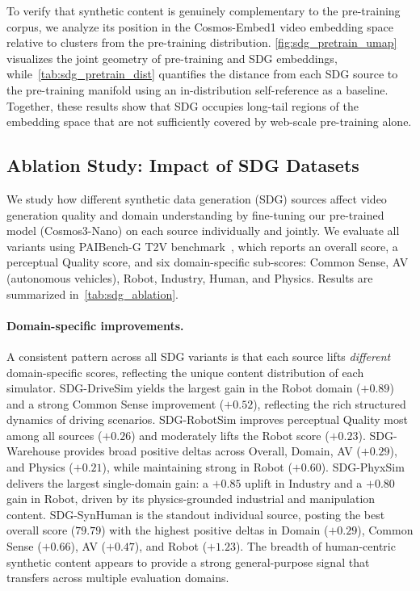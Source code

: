 

To verify that synthetic content is genuinely complementary to the pre-training corpus, we analyze its position in the Cosmos-Embed1 video embedding space relative to clusters from the pre-training distribution. \cref{fig:sdg_pretrain_umap} visualizes the joint geometry of pre-training and SDG embeddings, while~\cref{tab:sdg_pretrain_dist} quantifies the distance from each SDG source to the pre-training manifold using an in-distribution self-reference as a baseline. Together, these results show that SDG occupies long-tail regions of the embedding space that are not sufficiently covered by web-scale pre-training alone.

\subsection{Ablation Study: Impact of SDG Datasets}
\label{appendix:sdg_ablation}

We study how different synthetic data generation (SDG) sources affect video generation quality and domain understanding by fine-tuning our pre-trained model (Cosmos3-Nano) on each source individually and jointly. We evaluate all variants using PAIBench-G T2V benchmark~\citep{zhou2025paibench}, which reports an overall score, a perceptual Quality score, and six domain-specific sub-scores: Common Sense, AV (autonomous vehicles), Robot,
Industry, Human, and Physics. Results are summarized in~\cref{tab:sdg_ablation}.



\paragraph{Domain-specific improvements.}
A consistent pattern across all SDG variants is that each source lifts
\emph{different} domain-specific scores, reflecting the unique content
distribution of each simulator.
SDG-DriveSim yields the largest
gain in the Robot domain ($+0.89$) and a strong Common Sense improvement
($+0.52$), reflecting the rich structured dynamics of driving scenarios.
SDG-RobotSim improves perceptual Quality most among all sources ($+0.26$) and
moderately lifts the Robot score ($+0.23$). SDG-Warehouse provides broad
positive deltas across Overall, Domain, AV ($+0.29$), and Physics ($+0.21$),
while maintaining strong in Robot ($+0.60$). SDG-PhyxSim delivers the
largest single-domain gain: a $+0.85$ uplift in Industry and a $+0.80$ gain in
Robot, driven by its physics-grounded industrial and manipulation content.
SDG-SynHuman is the standout individual source, posting the best overall score
($79.79$) with the highest positive deltas in Domain ($+0.29$), Common Sense
($+0.66$), AV ($+0.47$), and Robot ($+1.23$). The breadth of human-centric synthetic content appears to
provide a strong general-purpose signal that transfers across multiple
evaluation domains.

